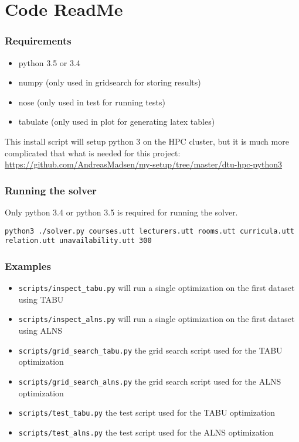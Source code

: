 \section{Code ReadMe}

\subsubsection*{Requirements}

\begin{itemize}[noitemsep]
\item python 3.5 or 3.4
\item numpy (only used in gridsearch for storing results)
\item nose (only used in test for running tests)
\item tabulate (only used in plot for generating latex tables)
\end{itemize}

This install script will setup python 3 on the HPC cluster, but it is much
more complicated that what is needed for this project:
\url{https://github.com/AndreasMadsen/my-setup/tree/master/dtu-hpc-python3}

\subsubsection*{Running the solver}

Only python 3.4 or python 3.5 is required for running the solver.

\begin{lstlisting}
python3 ./solver.py courses.utt lecturers.utt rooms.utt curricula.utt relation.utt unavailability.utt 300
\end{lstlisting}

\subsubsection*{Examples}

\begin{itemize}[noitemsep]
\item \texttt{scripts/inspect\_tabu.py} will run a single optimization on the first dataset using TABU
\item \texttt{scripts/inspect\_alns.py} will run a single optimization on the first dataset using ALNS
\item \texttt{scripts/grid\_search\_tabu.py} the grid search script used for the TABU optimization
\item \texttt{scripts/grid\_search\_alns.py} the grid search script used for the ALNS optimization
\item \texttt{scripts/test\_tabu.py} the test script used for the TABU optimization
\item \texttt{scripts/test\_alns.py} the test script used for the ALNS optimization
\end{itemize}

